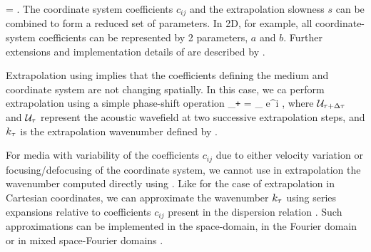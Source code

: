 \beq \label{eqn:rweoneway3d}
\kqz = 
\;.
\eeq
 The coordinate system coefficients $c_{ij}$ and the extrapolation slowness $s$ can be combined to form a reduced set of parameters. In 2D, for example, all coordinate-system coefficients can be represented by 2 parameters, $a$ and $b$. Further extensions and implementation details of  are described by \cite{SavaFomel.gp.rwehigh}.
\par
Extrapolation using  implies that the coefficients defining the medium and coordinate system are not changing spatially. In this case, we ca perform extrapolation using a simple phase-shift operation
\beq
\UU_{\tt+\Delta\tt} = \UU_{\tt} e^{i \kt \Delta\tt} \;,
\eeq
where $\mathcal{U}_{\tau+\Delta\tau}$ and $\mathcal{U}_{\tau}$ represent the acoustic wavefield at two successive extrapolation steps, and $k_\tau$ is the extrapolation wavenumber defined by .
\par
For media with variability of the coefficients $c_{ij}$ due to either velocity variation or focusing/defocusing of the coordinate system, we cannot use in extrapolation the wavenumber computed directly using . Like for the case of extrapolation in Cartesian  coordinates, we can approximate the wavenumber $k_\tau$ using series expansions relative to coefficients $c_{ij}$ present in the dispersion relation . Such approximations can be implemented in the space-domain, in the Fourier domain or in mixed space-Fourier domains \cite[]{SavaFomel.gp.rwehigh}.

